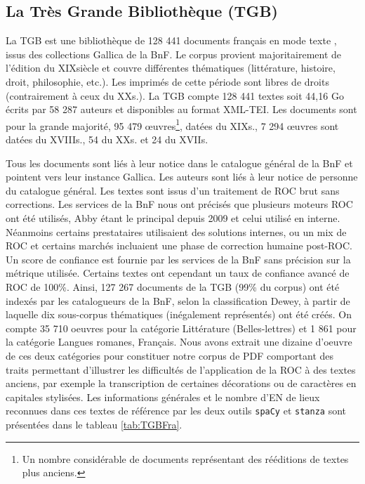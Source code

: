 
\subsection{La Très Grande Bibliothèque (TGB)}
 La TGB est une bibliothèque de 128 441 documents français en mode texte %
, issus des collections Gallica de la BnF. Le corpus provient majoritairement de l’édition du XIX\ieme{}siècle et couvre différentes thématiques (littérature, histoire, droit, philosophie, etc.). Les imprimés de cette période sont libres de droits (contrairement à ceux du XX\ieme{}s.). La TGB compte 128 441 textes soit 44,16 Go écrits par 58 287 auteurs et disponibles au format XML-TEI. Les documents sont pour la grande majorité, 95 479 œuvres\footnote{Un nombre considérable de documents représentant des rééditions de textes plus anciens.}, datées du XIX\ieme{}s., 7 294 œuvres sont datées du XVIII\ieme{}s., 54 du XX\ieme{}s. et 24 du XVII\ieme{}s.

Tous les documents sont liés à leur notice dans le catalogue général de la BnF et pointent vers leur instance Gallica. Les auteurs sont liés à leur notice de personne du catalogue général. Les textes sont issus d’un traitement de ROC brut sans corrections. Les services de la BnF nous ont précisés que plusieurs moteurs ROC ont été utilisés, Abby étant le principal depuis 2009 et celui utilisé en interne. Néanmoins certains prestataires utilisaient des solutions internes, ou un mix de ROC et certains marchés incluaient une phase de correction humaine post-ROC.
Un score de confiance est fournie par les services de la BnF sans précision sur la métrique utilisée. Certains textes ont cependant un taux de confiance avancé de ROC de 100\%. Ainsi, 127 267 documents de la TGB (99\% du corpus) ont été indexés par les catalogueurs de la BnF, selon la classification Dewey, à partir de laquelle dix sous-corpus thématiques (inégalement représentés) ont été créés. %
On compte 35 710 oeuvres pour la catégorie Littérature (Belles-lettres) et 1 861 pour la catégorie Langues romanes, Français. Nous avons extrait une dizaine d'oeuvre de ces deux catégories pour constituer notre corpus de PDF comportant des traits permettant d'illustrer les difficultés de l'application de la ROC à des textes anciens, par exemple la transcription de certaines décorations ou de caractères en capitales stylisées. Les informations générales et le nombre d'EN de lieux reconnues dans ces textes de référence par les deux outils \texttt{spaCy} et \texttt{stanza} sont présentées dans le tableau \ref{tab:TGBFra}. 


